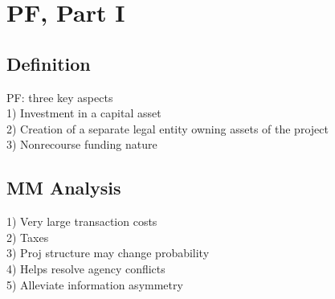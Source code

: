 \section{PF, Part I}
	\subsection*{Definition}
	PF: three key aspects\\
	1) Investment in a capital asset\\
	2) Creation of a separate legal entity owning assets of the project\\
	3) Nonrecourse funding nature
	
	\subsection*{MM Analysis}
	1) Very large transaction costs\\
	2) Taxes\\
	3) Proj structure may change probability\\
	4) Helps resolve agency conflicts\\
	5) Alleviate information asymmetry
